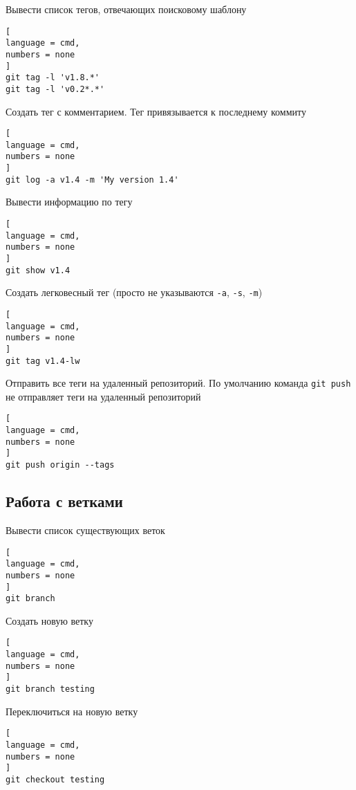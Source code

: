 \documentclass[%
	11pt,
	a4paper,
	utf8,
		]{article}
\begin{document}
Вывести список тегов, отвечающих поисковому  шаблону

\begin{lstlisting}[
language = cmd,
numbers = none
]
git tag -l 'v1.8.*'
git tag -l 'v0.2*.*'
\end{lstlisting}


Создать тег с комментарием. Тег привязывается к последнему коммиту

\begin{lstlisting}[
language = cmd,
numbers = none
]
git log -a v1.4 -m 'My version 1.4'
\end{lstlisting}

Вывести информацию по тегу

\begin{lstlisting}[
language = cmd,
numbers = none
]
git show v1.4
\end{lstlisting}


Создать легковесный тег (просто не указываются \texttt{-a}, \texttt{-s}, \texttt{-m})

\begin{lstlisting}[
language = cmd,
numbers = none
]
git tag v1.4-lw
\end{lstlisting}


Отправить все теги на удаленный репозиторий. По умолчанию команда \texttt{git push} не отправляет теги на удаленный репозиторий

\begin{lstlisting}[
language = cmd,
numbers = none
]
git push origin --tags
\end{lstlisting}


\subsection{Работа с ветками}

Вывести список существующих веток

\begin{lstlisting}[
language = cmd,
numbers = none
]
git branch
\end{lstlisting}


Создать новую ветку

\begin{lstlisting}[
language = cmd,
numbers = none
]
git branch testing
\end{lstlisting}

Переключиться на новую ветку

\begin{lstlisting}[
language = cmd,
numbers = none
]
git checkout testing
\end{lstlisting}
\end{document}
